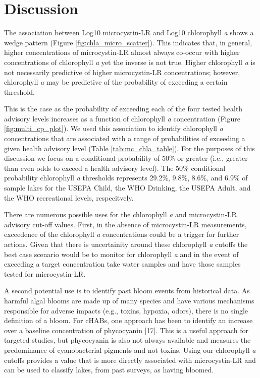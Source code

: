 \documentclass[10pt,a4paper,twocolumn]{article}
\begin{document}
\section{Discussion}\label{discussion}

The association between Log10 microcystin-LR and Log10 chlorophyll
\emph{a} shows a wedge pattern (Figure \ref{fig:chla_micro_scatter}).
This indicates that, in general, higher concentrations of microcystin-LR
almost always co-occur with higher concentrations of chlorophyll
\emph{a} yet the inverse is not true. Higher chlorophyll \emph{a} is not
necessarily predictive of higher microcystin-LR concentrations; however,
chlorophyll \emph{a} may be predictive of the probability of exceeding a
certain threshold.

This is the case as the probability of exceeding each of the four tested
health advisory levels increases as a function of chlorophyll \emph{a}
concentration (Figure \ref{fig:multi_cp_plot}). We used this association
to identify chlorophyll \emph{a} concentrations that are associated with
a range of probabilities of exceeding a given health advisory level
(Table \ref{tab:mc_chla_table}). For the purposes of this discussion we
focus on a conditional probability of 50\% or greater (i.e., greater
than even odds to exceed a health advisory level). The 50\% conditional
probability chlorophyll \emph{a} thresholds represents 29.2\%, 9.8\%,
8.6\%, and 6.9\% of sample lakes for the USEPA Child, the WHO Drinking,
the USEPA Adult, and the WHO recreational levels, respecitvely.

There are numerous possible uses for the chlorophyll \emph{a} and
microcystin-LR advisory cut-off values. First, in the absence of
microcystin-LR measurements, exceedence of the chlorophyll \emph{a}
concentrations could be a trigger for further actions. Given that there
is uncertainity around these chlorophyll \emph{a} cutoffs the best case
scenario would be to monitor for chlorophyll \emph{a} and in the event
of exceeding a target concentration take water samples and have those
samples tested for microcystin-LR.

A second potential use is to identify past bloom events from historical
data. As harmful algal blooms are made up of many species and have
various mechanisms responsible for adverse impacts (e.g., toxins,
hypoxia, odors), there is no single definition of a bloom. For cHABs,
one approach has been to identify an increase over a baseline
concentration of phycocyanin {[}17{]}. This is a useful approach for
targeted studies, but phycocyanin is also not always available and
measures the predominance of cyanobacterial pigments and not toxins.
Using our chlorophyll \emph{a} cutoffs provides a value that is more
directly associated with microcystin-LR and can be used to classify
lakes, from past surveys, as having bloomed.
\end{document}
